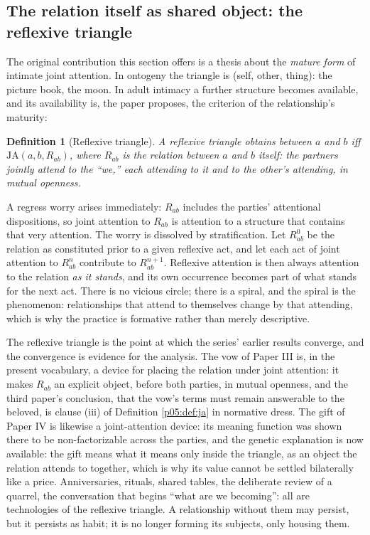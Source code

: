 \documentclass[11pt,a4paper]{article}
\theoremstyle{seriesthm}
\newtheorem{defn}{Definition}
\begin{document}
\subsection{The relation itself as shared object: the reflexive triangle}
\label{p05:sec:reflexive}

The original contribution this section offers is a thesis about the \emph{mature form} of intimate joint attention. In ontogeny the triangle is (self, other, thing): the picture book, the moon. In adult intimacy a further structure becomes available, and its availability is, the paper proposes, the criterion of the relationship's maturity:

\begin{defn}[Reflexive triangle]\label{p05:def:reflexive}
A reflexive triangle obtains between $a$ and $b$ iff $\mathrm{JA}(a,b,R_{ab})$, where $R_{ab}$ is the relation between $a$ and $b$ itself: the partners jointly attend to the ``we,'' each attending to it and to the other's attending, in mutual openness.
\end{defn}

A regress worry arises immediately: $R_{ab}$ includes the parties' attentional dispositions, so joint attention to $R_{ab}$ is attention to a structure that contains that very attention. The worry is dissolved by stratification. Let $R^{0}_{ab}$ be the relation as constituted prior to a given reflexive act, and let each act of joint attention to $R^{n}_{ab}$ contribute to $R^{n+1}_{ab}$. Reflexive attention is then always attention to the relation \emph{as it stands}, and its own occurrence becomes part of what stands for the next act. There is no vicious circle; there is a spiral, and the spiral is the phenomenon: relationships that attend to themselves change by that attending, which is why the practice is formative rather than merely descriptive.

The reflexive triangle is the point at which the series' earlier results converge, and the convergence is evidence for the analysis. The vow of Paper III is, in the present vocabulary, a device for placing the relation under joint attention: it makes $R_{ab}$ an explicit object, before both parties, in mutual openness, and the third paper's conclusion, that the vow's terms must remain answerable to the beloved, is clause (iii) of Definition \ref{p05:def:ja} in normative dress. The gift of Paper IV is likewise a joint-attention device: its meaning function was shown there to be non-factorizable across the parties, and the genetic explanation is now available: the gift means what it means only inside the triangle, as an object the relation attends to together, which is why its value cannot be settled bilaterally like a price. Anniversaries, rituals, shared tables, the deliberate review of a quarrel, the conversation that begins ``what are we becoming'': all are technologies of the reflexive triangle. A relationship without them may persist, but it persists as habit; it is no longer forming its subjects, only housing them.
\end{document}

